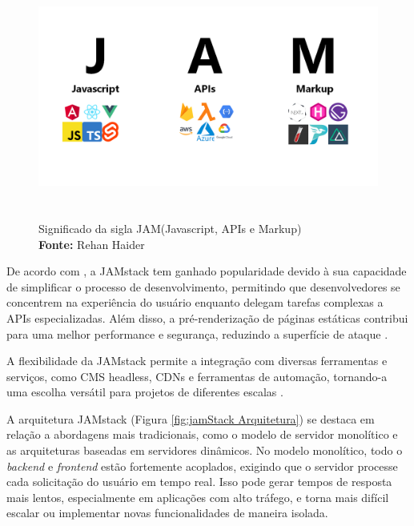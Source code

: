 \begin{figure}[H]
    \centering
    \includegraphics[height=8cm, keepaspectratio]{img/arquitetura/sigla JAM stack.png}
    \caption{ Significado da sigla JAM(Javascript, APIs e Markup)
 \\
        \textbf{Fonte:} Rehan Haider}
    \label{fig:jamStack sigla}
\end{figure}
De acordo com \cite{smashingmagazine}, a JAMstack tem ganhado popularidade devido à sua capacidade de simplificar o processo de desenvolvimento, permitindo que desenvolvedores se concentrem na experiência do usuário enquanto delegam tarefas complexas a APIs especializadas. Além disso, a pré-renderização de páginas estáticas contribui para uma melhor performance e segurança, reduzindo a superfície de ataque \citep{jamstackbook}.

A flexibilidade da JAMstack permite a integração com diversas ferramentas e serviços, como CMS headless, CDNs e ferramentas de automação, tornando-a uma escolha versátil para projetos de diferentes escalas \citep{netlifyjamstack}.

A arquitetura JAMstack (Figura \ref{fig:jamStack Arquitetura}) se destaca em relação a abordagens mais tradicionais, como o modelo de servidor monolítico e as arquiteturas baseadas em servidores dinâmicos. No modelo monolítico, todo o \textit{backend} e \textit{frontend} estão fortemente acoplados, exigindo que o servidor processe cada solicitação do usuário em tempo real. Isso pode gerar tempos de resposta mais lentos, especialmente em aplicações com alto tráfego, e torna mais difícil escalar ou implementar novas funcionalidades de maneira isolada.

